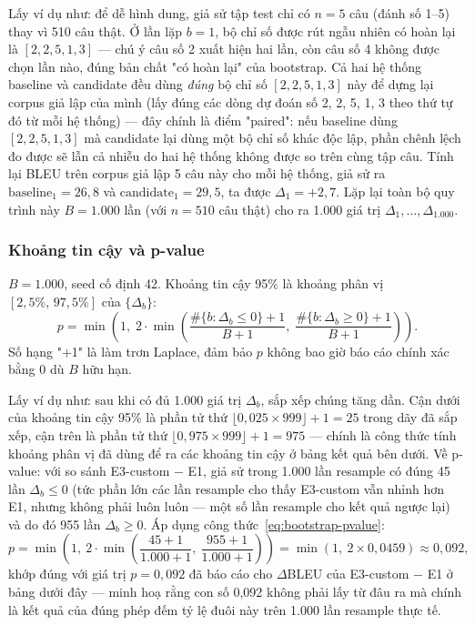 Lấy ví dụ như: để dễ hình dung, giả sử tập test chỉ có $n=5$ câu (đánh số 1--5) thay vì
510 câu thật. Ở lần lặp $b=1$, bộ chỉ số được rút ngẫu nhiên có hoàn lại là
$[2,2,5,1,3]$ — chú ý câu số 2 xuất hiện hai lần, còn câu số 4 không được chọn lần nào,
đúng bản chất "có hoàn lại" của bootstrap. Cả hai hệ thống baseline và candidate đều
dùng \emph{đúng} bộ chỉ số $[2,2,5,1,3]$ này để dựng lại corpus giả lập của mình (lấy
đúng các dòng dự đoán số 2, 2, 5, 1, 3 theo thứ tự đó từ mỗi hệ thống) — đây chính là
điểm "paired": nếu baseline dùng $[2,2,5,1,3]$ mà candidate lại dùng một bộ chỉ số khác
độc lập, phần chênh lệch đo được sẽ lẫn cả nhiễu do hai hệ thống không được so trên cùng
tập câu. Tính lại BLEU trên corpus giả lập 5 câu này cho mỗi hệ thống, giả sử ra
$\text{baseline}_1 = 26{,}8$ và $\text{candidate}_1 = 29{,}5$, ta được $\Delta_1 = +2{,}7$.
Lặp lại toàn bộ quy trình này $B=1.000$ lần (với $n=510$ câu thật) cho ra 1.000 giá trị
$\Delta_1, \dots, \Delta_{1.000}$.

\subsubsection*{Khoảng tin cậy và p-value}

$B=1.000$, seed cố định 42. Khoảng tin cậy 95\% là khoảng phân vị $[2,5\%,\,97,5\%]$
của $\{\Delta_b\}$:
\begin{equation}
  p = \min\!\left(1,\; 2 \cdot \min\!\left(
    \frac{\#\{b : \Delta_b \le 0\} + 1}{B + 1},\;
    \frac{\#\{b : \Delta_b \ge 0\} + 1}{B + 1}
  \right)\right).
  \label{eq:bootstrap-pvalue}
\end{equation}
Số hạng "+1" là làm trơn Laplace, đảm bảo $p$ không bao giờ báo cáo chính xác bằng 0 dù
$B$ hữu hạn.

Lấy ví dụ như: sau khi có đủ 1.000 giá trị $\Delta_b$, sắp xếp chúng tăng dần. Cận dưới
của khoảng tin cậy 95\% là phần tử thứ $\lfloor 0{,}025 \times 999 \rfloor + 1 = 25$
trong dãy đã sắp xếp, cận trên là phần tử thứ $\lfloor 0{,}975 \times 999 \rfloor + 1 = 975$
— chính là công thức tính khoảng phân vị đã dùng để ra các khoảng tin cậy ở bảng kết quả
bên dưới. Về p-value: với so sánh E3-custom $-$ E1, giả sử trong 1.000 lần resample có
đúng 45 lần $\Delta_b \le 0$ (tức phần lớn các lần resample cho thấy E3-custom vẫn nhỉnh
hơn E1, nhưng không phải luôn luôn — một số lần resample cho kết quả ngược lại) và do đó
955 lần $\Delta_b \ge 0$. Áp dụng công thức~\ref{eq:bootstrap-pvalue}:
\begin{equation*}
  p = \min\!\left(1,\ 2 \cdot \min\!\left(\frac{45+1}{1.000+1},\ \frac{955+1}{1.000+1}\right)\right)
    = \min\!\left(1,\ 2 \times 0{,}0459\right) \approx 0{,}092,
\end{equation*}
khớp đúng với giá trị $p=0{,}092$ đã báo cáo cho $\Delta$BLEU của E3-custom $-$ E1 ở bảng
dưới đây — minh hoạ rằng con số 0,092 không phải lấy từ đâu ra mà chính là kết quả của
đúng phép đếm tỷ lệ đuôi này trên 1.000 lần resample thực tế.

